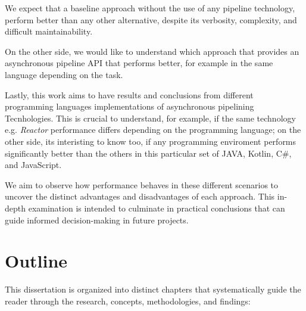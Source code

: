 We expect that a baseline approach without the use of any pipeline technology, perform better than any other alternative, despite its verbosity, complexity, and difficult maintainability.

On the other side, we would like to understand which approach that provides an asynchronous pipeline API that performs better, for example in the same language depending on the task.

Lastly, this work aims to have results and conclusions from different programming languages implementations of asynchronous pipelining Tecnhologies. This is crucial to understand, for example, if the same technology e.g. \textit{Reactor} performance differs depending on the programming language; on the other side, its interisting to know too, if any programming enviroment performs significantly better than the others in this particular set of   JAVA, Kotlin, C\#, and JavaScript. 

We aim to observe how performance behaves in these different scenarios to uncover the distinct advantages and disadvantages of each approach. This in-depth examination is intended to culminate in practical conclusions that can guide informed decision-making in future projects.

\section{Outline}
\label{sec:outline}

This dissertation is organized into distinct chapters that systematically guide the reader through the research, concepts, methodologies, and findings:

